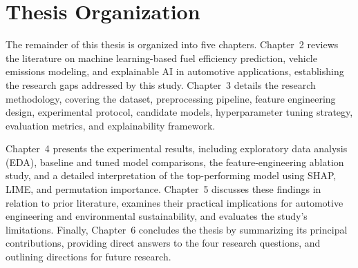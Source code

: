 \section{Thesis Organization}

The remainder of this thesis is organized into five chapters. Chapter~2 reviews the literature on machine learning-based fuel efficiency prediction, vehicle emissions modeling, and explainable AI in automotive applications, establishing the research gaps addressed by this study. Chapter~3 details the research methodology, covering the dataset, preprocessing pipeline, feature engineering design, experimental protocol, candidate models, hyperparameter tuning strategy, evaluation metrics, and explainability framework.

Chapter~4 presents the experimental results, including exploratory data analysis (EDA), baseline and tuned model comparisons, the feature-engineering ablation study, and a detailed interpretation of the top-performing model using SHAP, LIME, and permutation importance. Chapter~5 discusses these findings in relation to prior literature, examines their practical implications for automotive engineering and environmental sustainability, and evaluates the study's limitations. Finally, Chapter~6 concludes the thesis by summarizing its principal contributions, providing direct answers to the four research questions, and outlining directions for future research.
